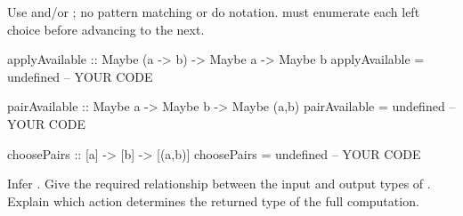 Use \code{<$>} and/or \code{<*>}; no pattern matching or do notation.
 must enumerate each left choice before advancing to the next.
\par\noindent\begin{minipage}{\linewidth}
\begin{codeanswer}
applyAvailable :: Maybe (a -> b) -> Maybe a -> Maybe b
applyAvailable = undefined  -- YOUR CODE

pairAvailable :: Maybe a -> Maybe b -> Maybe (a,b)
pairAvailable = undefined  -- YOUR CODE

choosePairs :: [a] -> [b] -> [(a,b)]
choosePairs = undefined  -- YOUR CODE
\end{codeanswer}
\end{minipage}\par

Infer . Give the required relationship between the
input and output types of . Explain which action determines the returned
type of the full computation.
